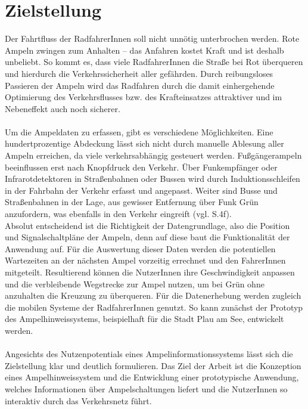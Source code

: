 \section{Zielstellung}
Der Fahrtfluss der RadfahrerInnen soll nicht unnötig unterbrochen werden. Rote Ampeln zwingen zum Anhalten -- das Anfahren kostet Kraft und ist deshalb unbeliebt. So kommt es, dass viele RadfahrerInnen die Straße bei Rot überqueren und hierdurch die Verkehrssicherheit aller gefährden. Durch reibungsloses Passieren der Ampeln wird das Radfahren durch die damit einhergehende Optimierung des Verkehrsflusses bzw. des Krafteinsatzes attraktiver und im Nebeneffekt auch noch sicherer.\\\\
Um die Ampeldaten zu erfassen, gibt es verschiedene Möglichkeiten. Eine hundertprozentige Abdeckung lässt sich nicht durch manuelle Ablesung aller Ampeln erreichen, da viele  verkehrsabhängig gesteuert werden. Fußgängerampeln beeinflussen erst nach Knopfdruck den Verkehr. Über Funkempfänger oder Infrarotdetektoren in Straßenbahnen oder Bussen wird durch Induktionsschleifen in der Fahrbahn der Verkehr erfasst und angepasst. Weiter sind Busse und Straßenbahnen in der Lage, aus gewisser Entfernung über Funk Grün anzufordern, was ebenfalls in den Verkehr eingreift (vgl. \cite{lsa_bln} S.4f). \\
Absolut entscheidend ist die Richtigkeit der Datengrundlage, also die Position und Signalschaltpläne der Ampeln, denn auf diese baut die Funktionalität der Anwendung auf.
Für die Auswertung dieser Daten werden die potentiellen Wartezeiten an der nächsten Ampel vorzeitig errechnet und den FahrerInnen mitgeteilt. Resultierend können die NutzerInnen ihre Geschwindigkeit anpassen und die verbleibende Wegstrecke zur Ampel nutzen, um bei Grün ohne anzuhalten die Kreuzung zu überqueren. Für die Datenerhebung werden zugleich die mobilen Systeme der RadfahrerInnen genutzt. So kann zunächst der Prototyp des Ampelhinweissystems, beispielhaft für die Stadt Plau am See, entwickelt werden.\\\\
Angesichts des Nutzenpotentials eines Ampelinformationssystems lässt sich die Zielstellung klar und deutlich formulieren. Das Ziel der Arbeit ist die Konzeption eines Ampelhinweissystem und die Entwicklung einer prototypische Anwendung, welches Informationen über Ampelschaltungen liefert und die NutzerInnen so interaktiv durch das Verkehrsnetz führt.
